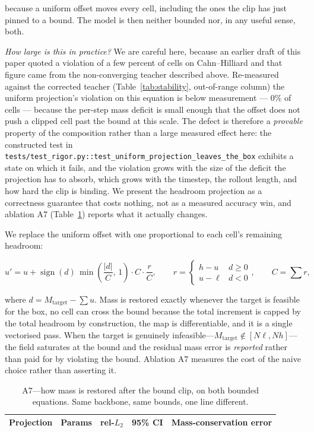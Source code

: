 \documentclass{article}
\newcommand{\code}[1]{\texttt{\small #1}}
\begin{document}
because a uniform offset moves every cell, including the ones the clip has just pinned to a
bound. The model is then neither bounded nor, in any useful sense, both.

\emph{How large is this in practice?} We are careful here, because an earlier draft of this
paper quoted a violation of a few percent of cells on Cahn--Hilliard and that figure came
from the non-converging teacher described above. Re-measured against the corrected teacher
(Table~\ref{tab:stability}, out-of-range column) the uniform projection's violation on this
equation is below measurement --- $0\%$ of cells --- because the per-step mass deficit is
small enough that the offset does not push a clipped cell past the bound at this scale. The
defect is therefore a \emph{provable} property of the composition rather than a large
measured effect here: the constructed test in
\code{tests/test\_rigor.py::test\_uniform\_projection\_leaves\_the\_box} exhibits a state on
which it fails, and the violation grows with the size of the deficit the projection has to
absorb, which grows with the timestep, the rollout length, and how hard the clip is binding.
We present the headroom projection as a correctness guarantee that costs nothing, not as a
measured accuracy win, and ablation A7 (Table~\ref{tab:a7}) reports what it actually
changes.

We replace the uniform offset with one proportional to each cell's remaining headroom:

\begin{equation}
u' = u + \operatorname{sign}(d)\,\min\!\left(\frac{|d|}{C},\,1\right) \cdot C \cdot
     \frac{r}{C},
\qquad
r = \begin{cases} h - u & d \geq 0\\ u - \ell & d < 0\end{cases},
\qquad
C = \textstyle\sum r,
\end{equation}

where $d = M_{\text{target}} - \sum u$. Mass is restored exactly whenever the target is
feasible for the box, no cell can cross the bound because the total increment is capped by
the total headroom by construction, the map is differentiable, and it is a single
vectorised pass. When the target is genuinely infeasible---$M_{\text{target}} \notin
[N\ell, Nh]$---the field saturates at the bound and the residual mass error is
\emph{reported} rather than paid for by violating the bound. Ablation A7 measures the cost
of the naive choice rather than asserting it.

\begin{table}[h]
\centering
\caption{A7---how mass is restored after the bound clip, on both bounded equations. Same
backbone, same bounds, one line different.}
\label{tab:a7}
\small
\begin{tabular}{lrccc}
\toprule
Projection & Params & rel-$L_2$ & 95\% CI & Mass-conservation error \\
\midrule

\bottomrule
\end{tabular}
\end{table}
\end{document}

